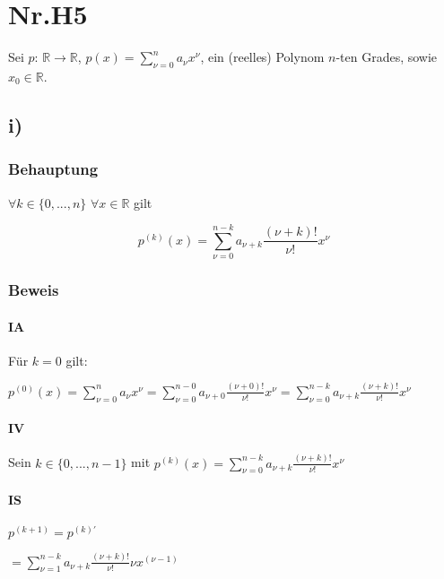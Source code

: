 \section*{Nr.H5}

Sei $p$: $\mathbb{R} \to \mathbb{R}$, $p(x)=\sum\limits^{n}_{\nu=0}a_{\nu}x^{\nu}$,
ein (reelles) Polynom $n$-ten Grades, sowie $x_{0} \in \mathbb{R}$.

\subsection*{i)}

\subsubsection*{Behauptung}

$\forall k \in \{0,...,n\}$ $\forall x \in \mathbb{R}$ gilt

\[
	p^{(k)}(x) = \sum\limits^{n-k}_{\nu=0}a_{\nu+k}\frac{(\nu+k)!}{\nu!}x^{\nu} 
\]

\subsubsection*{Beweis}

\paragraph*{IA}

Für $k = 0$ gilt:

$
 p^{(0)}(x)
 = \sum\limits^{n}_{\nu=0} a_{\nu} x^{\nu}
 = \sum\limits^{n-0}_{\nu=0} a_{\nu+0} \frac{(\nu+0)!}{\nu!} x^{\nu}
 = \sum\limits^{n-k}_{\nu=0} a_{\nu+k} \frac{(\nu+k)!}{\nu!} x^{\nu}
$  


\paragraph*{IV}

Sein $k \in \{0,...,n-1\}$ mit 
$p^{(k)}(x) = \sum\limits^{n-k}_{\nu=0}a_{\nu+k}\frac{(\nu+k)!}{\nu!}x^{\nu} $

\paragraph*{IS}

$ p^{(k+1)} = p^{(k)\prime}$

$ = \sum\limits^{n-k}_{\nu=1} a_{\nu+k} \frac{(\nu+k)!}{\nu!} \nu x^{(\nu-1)}$

